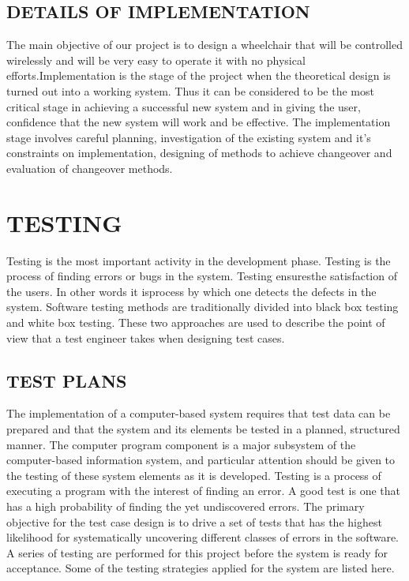 \documentclass[12pt]{report} %
\begin{document}
\section{DETAILS OF IMPLEMENTATION}
\label{sec:DETAILS OF IMPLEMENTATION}

The main objective of our project is to design a wheelchair that will be controlled wirelessly and will be very easy to operate it with no physical efforts.Implementation is the stage of the project when the theoretical design is turned out into a working system. Thus it can be considered to be the most critical stage in achieving a successful new system and in giving the user, confidence that the new system will work and be effective.
The implementation stage involves careful planning, investigation of the existing system and it's constraints on implementation, designing of methods to achieve changeover and evaluation of changeover methods.




\chapter{TESTING}
\label{cha:TESTING}

Testing is the most important activity in the development phase. Testing is the process of    finding   errors or bugs in the system. Testing ensuresthe satisfaction of the users. In other words it isprocess by which one detects the defects in the system. Software testing methods are  traditionally divided into black box testing and white box testing. These two approaches are used to describe the point of view that a test engineer takes when designing test cases.

\section{TEST PLANS}
\label{sec:TEST PLANS}

The implementation of a computer-based system requires that test data can be prepared and that the system and its elements be tested in a planned, structured manner. The computer program component is a major subsystem of the computer-based information system, and particular attention should be given to the testing of these system elements as it is developed.
Testing is a process of executing a program with the interest of finding an error. A good test is one that has a high probability of finding the yet undiscovered errors. The primary objective for the test case design is to drive a set of tests that has the highest likelihood for systematically uncovering different classes of errors in the software. A series of testing are performed for this project before the system is ready for acceptance.  Some of the testing strategies applied for the system are listed here.
\end{document}
